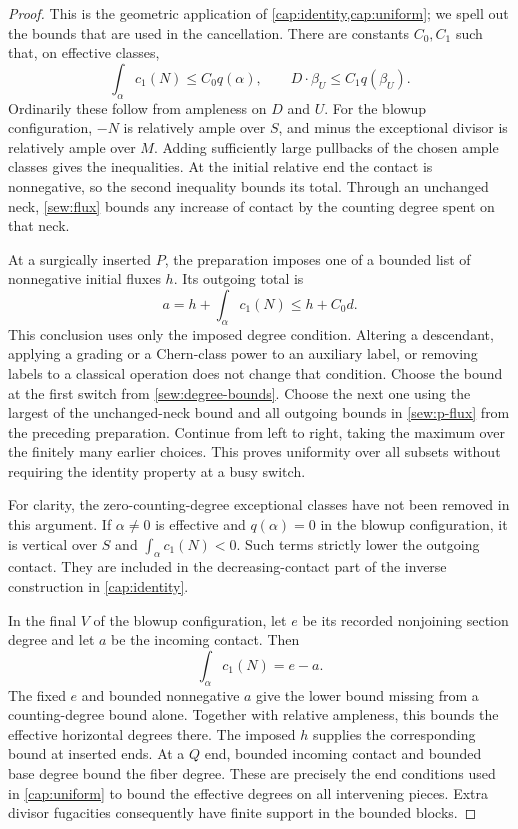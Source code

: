 \begin{proof}
This is the geometric application of \cref{cap:identity,cap:uniform};
we spell out the bounds that are used in the cancellation.  There are
constants $C_0,C_1$ such that, on effective classes,
\begin{equation}\label{sew:degree-bounds}
 \int_\alpha c_1(N)\leq C_0q(\alpha),\qquad
 D\cdot\beta_U\leq C_1q(\beta_U).
\end{equation}
Ordinarily these follow from ampleness on $D$ and $U$.  For the blowup
configuration, $-N$ is relatively ample over $S$, and minus the
exceptional divisor is relatively ample over $M$.  Adding sufficiently
large pullbacks of the chosen ample classes gives the inequalities.
At the initial relative end the contact is nonnegative, so the second
inequality bounds its total.  Through an unchanged neck,
\eqref{sew:flux} bounds any increase of contact by the counting degree
spent on that neck.

At a surgically inserted $P$, the preparation imposes one of a bounded
list of nonnegative initial fluxes $h$.  Its outgoing total is
\begin{equation}\label{sew:p-flux}
 a=h+\int_\alpha c_1(N)\leq h+C_0d.
\end{equation}
This conclusion uses only the imposed degree condition.  Altering a
descendant, applying a grading or a Chern-class power to an auxiliary
label, or removing labels to a classical operation does not change
that condition.  Choose the bound at the first switch from
\eqref{sew:degree-bounds}.  Choose the next one using the largest of
the unchanged-neck bound and all outgoing bounds in
\eqref{sew:p-flux} from the preceding preparation.  Continue from left
to right, taking the maximum over the finitely many earlier choices.
This proves uniformity over all subsets without requiring the
identity property at a busy switch.

For clarity, the zero-counting-degree exceptional classes have not
been removed in this argument.  If $\alpha\ne0$ is effective and
$q(\alpha)=0$ in the blowup configuration, it is vertical over $S$ and
$\int_\alpha c_1(N)<0$.  Such terms strictly lower the outgoing
contact.  They are included in the decreasing-contact part of the
inverse construction in \cref{cap:identity}.

In the final $V$ of the blowup configuration, let $e$ be its recorded
nonjoining section degree and let $a$ be the incoming contact.  Then
\[
 \int_\alpha c_1(N)=e-a.
\]
The fixed $e$ and bounded nonnegative $a$ give the lower bound missing
from a counting-degree bound alone.  Together with relative
ampleness, this bounds the effective horizontal degrees there.  The
imposed $h$ supplies the corresponding bound at inserted ends.  At a
$Q$ end, bounded incoming contact and bounded base degree bound the
fiber degree.  These are precisely the end conditions used in
\cref{cap:uniform} to bound the effective degrees on all intervening
pieces.  Extra divisor fugacities consequently have finite support in
the bounded blocks.


\end{proof}
